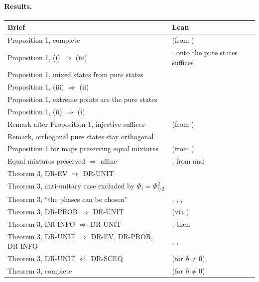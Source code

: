 \documentclass[11pt]{article}
\begin{document}
\paragraph{Results.}
\begin{center}
\begin{tabularx}{\textwidth}{@{}BL@{}}
\toprule
Brief & Lean \\
\midrule
Proposition 1, complete &  (from
  ) \\
Proposition 1, (i) $\Rightarrow$ (iii) & : onto the pure states suffices \\
Proposition 1, mixed states from pure states &  \\
Proposition 1, (iii) $\Rightarrow$ (ii) &  \\
Proposition 1, extreme points are the pure states &  \\
Proposition 1, (ii) $\Rightarrow$ (i) &  \\
Remark after Proposition 1, injective suffices &  (from
  ) \\
Remark, orthogonal pure states stay orthogonal &
   \\
Proposition 1 for maps preserving equal mixtures &
   (from
  ) \\
Equal mixtures preserved $\Rightarrow$ affine & , from
   and  \\
Theorem 3, DR-EV $\Rightarrow$ DR-UNIT &  \\
Theorem 3, anti-unitary case excluded by $\Phi_t = \Phi_{t/2}^2$ &
   \\
Theorem 3, ``the phases can be chosen'' & ,
  ,
  ,  \\
Theorem 3, DR-PROB $\Rightarrow$ DR-UNIT &  (via
  ) \\
Theorem 3, DR-INFO $\Rightarrow$ DR-UNIT & , then  \\
Theorem 3, DR-UNIT $\Rightarrow$ DR-EV, DR-PROB, DR-INFO & ,
  ,  \\
Theorem 3, DR-UNIT $\Leftrightarrow$ DR-SCEQ &  (for $\hbar \ne 0$),
   \\
Theorem 3, complete &  (for $\hbar \ne 0$) \\
\bottomrule
\end{tabularx}
\end{center}
\end{document}
